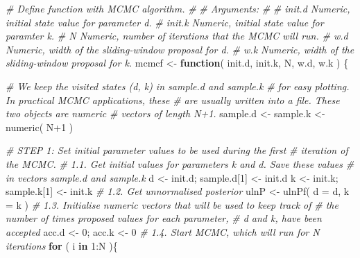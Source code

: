 \documentclass[
]{article}
\newenvironment{Shaded}{\begin{snugshade}}{\end{snugshade}}
\newcommand{\AttributeTok}[1]{\textcolor[rgb]{0.77,0.63,0.00}{#1}}
\newcommand{\CommentTok}[1]{\textcolor[rgb]{0.56,0.35,0.01}{\textit{#1}}}
\newcommand{\ControlFlowTok}[1]{\textcolor[rgb]{0.13,0.29,0.53}{\textbf{#1}}}
\newcommand{\DecValTok}[1]{\textcolor[rgb]{0.00,0.00,0.81}{#1}}
\newcommand{\FunctionTok}[1]{\textcolor[rgb]{0.00,0.00,0.00}{#1}}
\newcommand{\NormalTok}[1]{#1}
\newcommand{\OtherTok}[1]{\textcolor[rgb]{0.56,0.35,0.01}{#1}}
\newcommand{\SpecialCharTok}[1]{\textcolor[rgb]{0.00,0.00,0.00}{#1}}
\begin{document}
\begin{Shaded}
\begin{Highlighting}[]
\CommentTok{\# Define function with MCMC algorithm.}
\CommentTok{\#}
\CommentTok{\# Arguments:}
\CommentTok{\#}
\CommentTok{\#   init.d  Numeric, initial state value for parameter d.}
\CommentTok{\#   init.k  Numeric, initial state value for paramter k.}
\CommentTok{\#   N       Numeric, number of iterations that the MCMC will run.}
\CommentTok{\#   w.d     Numeric, width of the sliding{-}window proposal for d.}
\CommentTok{\#   w.k     Numeric, width of the sliding{-}window proposal for k.}
\NormalTok{mcmcf }\OtherTok{\textless{}{-}} \ControlFlowTok{function}\NormalTok{( init.d, init.k, N, w.d, w.k ) \{}

  \CommentTok{\# We keep the visited states (d, k) in sample.d and sample.k}
  \CommentTok{\# for easy plotting. In practical MCMC applications, these}
  \CommentTok{\# are usually written into a file. These two objects are numeric}
  \CommentTok{\# vectors of length N+1.}
\NormalTok{  sample.d }\OtherTok{\textless{}{-}}\NormalTok{ sample.k }\OtherTok{\textless{}{-}} \FunctionTok{numeric}\NormalTok{( N}\SpecialCharTok{+}\DecValTok{1}\NormalTok{ )}

  \CommentTok{\# STEP 1: Set initial parameter values to be used during the first}
  \CommentTok{\#         iteration of the MCMC.}
  \CommentTok{\# 1.1. Get initial values for parameters k and d. Save these values}
  \CommentTok{\#      in vectors sample.d and sample.k}
\NormalTok{  d }\OtherTok{\textless{}{-}}\NormalTok{ init.d;  sample.d[}\DecValTok{1}\NormalTok{] }\OtherTok{\textless{}{-}}\NormalTok{ init.d}
\NormalTok{  k }\OtherTok{\textless{}{-}}\NormalTok{ init.k;  sample.k[}\DecValTok{1}\NormalTok{] }\OtherTok{\textless{}{-}}\NormalTok{ init.k}
  \CommentTok{\# 1.2. Get unnormalised posterior}
\NormalTok{  ulnP  }\OtherTok{\textless{}{-}} \FunctionTok{ulnPf}\NormalTok{( }\AttributeTok{d =}\NormalTok{ d, }\AttributeTok{k =}\NormalTok{ k )}
  \CommentTok{\# 1.3. Initialise numeric vectors that will be used to keep track of}
  \CommentTok{\#      the number of times proposed values for each parameter,}
  \CommentTok{\#      d and k, have been accepted}
\NormalTok{  acc.d }\OtherTok{\textless{}{-}} \DecValTok{0}\NormalTok{; acc.k }\OtherTok{\textless{}{-}} \DecValTok{0}
  \CommentTok{\# 1.4. Start MCMC, which will run for N iterations}
  \ControlFlowTok{for}\NormalTok{ ( i }\ControlFlowTok{in} \DecValTok{1}\SpecialCharTok{:}\NormalTok{N )\{}


\end{Highlighting}
\end{Shaded}
\end{document}
